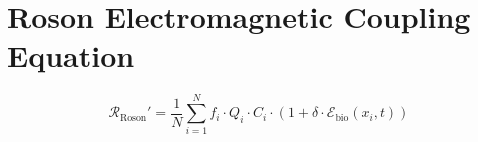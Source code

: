 \documentclass{article}
\begin{document}
\section*{Roson Electromagnetic Coupling Equation}
\[
\mathcal{R}_\text{Roson}' = \frac{1}{N} \sum_{i=1}^{N} f_i \cdot Q_i \cdot C_i \cdot \left(1 + \delta \cdot \mathcal{E}_\text{bio}(x_i,t)\right)
\]
\end{document}
